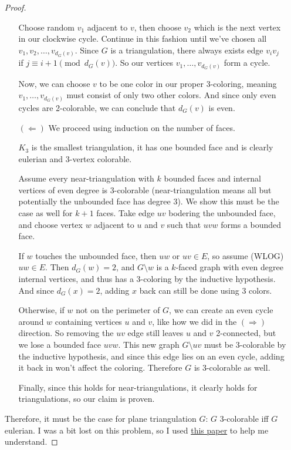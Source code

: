 \documentclass[11pt]{article}
\newcommand{\n}{\vspace{0.2cm}}
\begin{document}
\begin{itemize}
\begin{proof}
\begin{enumerate}
        Choose random \(v_1\) adjacent to \(v\), then choose \(v_2\) which is the next vertex in our clockwise cycle.  Continue in this fashion until we've chosen all \(v_1, v_2, \hdots, v_{d_G(v)}\).  Since \(G\) is a triangulation, there always exists edge \(v_iv_j\) if \(j \equiv i+1 \pmod{d_G(v)}\).  So our vertices \(v_1, \hdots, v_{d_G(v)}\) form a cycle. \n

        Now, we can choose \(v\) to be one color in our proper 3-coloring, meaning \(v_1, \hdots, v_{d_G(v)}\) must consist of only two other colors.  And since only even cycles are 2-colorable, we can conclude that \(d_G(v)\) is even. \n

      \item[\((\Leftarrow)\)] We proceed using induction on the number of faces. \n

        \(K_3\) is the smallest triangulation, it has one bounded face and is clearly eulerian and 3-vertex colorable. \n

        Assume every near-triangulation with \(k\) bounded faces and internal vertices of even degree is 3-colorable (near-triangulation means all but potentially the unbounded face has degree 3).  We show this must be the case as well for \(k+1\) faces.  Take edge \(uv\) bodering the unbounded face, and choose vertex \(w\) adjacent to \(u\) and \(v\) such that \(uvw\) forms a bounded face. \n

        If \(w\) touches the unbounded face, then \(uw\) or \(uv \in E\), so assume (WLOG) \(uw \in E\).  Then \(d_G(w)=2\), and \(G \setminus w\) is a \(k\)-faced graph with even degree internal vertices, and thus has a 3-coloring by the inductive hypothesis.  And since \(d_G(x) = 2\), adding \(x\) back can still be done using 3 colors. \n

        Otherwise, if \(w\) not on the perimeter of \(G\), we can create an even cycle around \(w\) containing vertices \(u\) and \(v\), like how we did in the \((\Rightarrow)\) direction.  So removing the \(uv\) edge still leaves \(u\) and \(v\) 2-connected, but we lose a bounded face \(uvw\).  This new graph \(G \setminus uv\) must be 3-colorable by the inductive hypothesis, and since this edge lies on an even cycle, adding it back in won't affect the coloring.  Therefore \(G\) is 3-colorable as well. \n

        Finally, since this holds for near-triangulations, it clearly holds for triangulations, so our claim is proven.
    \end{enumerate}

    Therefore, it must be the case for plane triangulation \(G\): \(G\) 3-colorable iff \(G\) eulerian.  I was a bit lost on this problem, so I used \href{https://faculty.math.illinois.edu/~west/pubs/eultri.pdf}{this paper} to help me understand.
  \end{proof}
  
\end{itemize}
\end{document}
